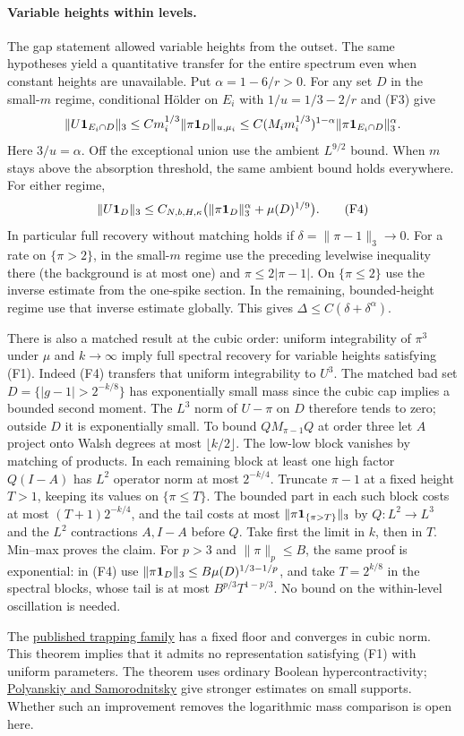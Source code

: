 \paragraph{Variable heights within levels.}
The gap statement allowed variable heights from the outset. The same
hypotheses yield a quantitative transfer for the entire spectrum even
when constant heights are unavailable. Put $\alpha=1-6/r>0$.
For any set $D$ in the small-$m$ regime, conditional H\"older on $E_i$
with $1/u=1/3-2/r$ and (F3) give
\[
 \|U{\bf1}_{E_i\cap D}\|_3
 \le C m_i^{1/3}\|\pi{\bf1}_D\|_{u,\mu_i}
 \le C (M_i m_i^{1/3})^{1-\alpha}
            \|\pi{\bf1}_{E_i\cap D}\|_3^\alpha .
\]
Here $3/u=\alpha$. Off the exceptional union use the ambient
$L^{9/2}$ bound. When $m$ stays above the absorption threshold, the
same ambient bound holds everywhere. For either regime,
\[
 \|U{\bf1}_D\|_3
 \le C_{N,b,H,\kappa}
       \big(\|\pi{\bf1}_D\|_3^\alpha+\mu(D)^{1/9}\big). \tag{F4}
\]
In particular full recovery without matching holds if
$\delta=\|\pi-1\|_3\to0$. For a rate on $\{\pi>2\}$, in the small-$m$
regime use the preceding levelwise inequality there (the background is
at most one) and $\pi\le2|\pi-1|$. On $\{\pi\le2\}$ use the inverse
estimate from the one-spike section. In the remaining, bounded-height
regime use that inverse estimate globally. This gives
$\Delta\le C(\delta+\delta^\alpha)$.

There is also a matched result at the cubic order: uniform
integrability of $\pi^3$ under $\mu$ and $k\to\infty$ imply full
spectral recovery for variable heights satisfying (F1). Indeed (F4)
transfers that uniform integrability to $U^3$. The matched bad set
$D=\{|g-1|>2^{-k/8}\}$ has exponentially small mass since the cubic
cap implies a bounded second moment. The $L^3$ norm of $U-\pi$ on $D$
therefore tends to zero; outside $D$ it is exponentially small.
To bound $QM_{\pi-1}Q$ at order three let $A$ project onto Walsh degrees
at most $\lfloor k/2\rfloor$. The low-low block vanishes by matching of
products. In each remaining block at least one high factor
$Q(I-A)$ has $L^2$ operator norm at most $2^{-k/4}$. Truncate
$\pi-1$ at a fixed height $T>1$, keeping its values on $\{\pi\le T\}$.
The bounded part in each such block costs at most $(T+1)2^{-k/4}$,
and the tail costs at most $\|\pi{\bf1}_{\{\pi>T\}}\|_3$ by
$Q:L^2\to L^3$ and the $L^2$ contractions $A,I-A$ before $Q$.
Take first the limit in $k$, then in $T$. Min--max proves the claim.
For $p>3$ and $\|\pi\|_p\le B$, the same proof is exponential:
in (F4) use $\|\pi{\bf1}_D\|_3\le B\mu(D)^{1/3-1/p}$, and take
$T=2^{k/8}$ in the spectral blocks, whose tail is at most
$B^{p/3}T^{1-p/3}$. No bound on the within-level oscillation is needed.

The \href{https://airr.science/papers/ARR-2026-2B2W1WQ7DF9N5VW7/versions/v1/}{published trapping family}
has a fixed floor and converges in cubic norm. This theorem implies
that it admits no representation satisfying (F1) with uniform
parameters. The theorem uses ordinary Boolean hypercontractivity;
\href{https://arxiv.org/abs/1606.07491}{Polyanskiy and Samorodnitsky}
give stronger estimates on small supports. Whether such an improvement
removes the logarithmic mass comparison is open here.
